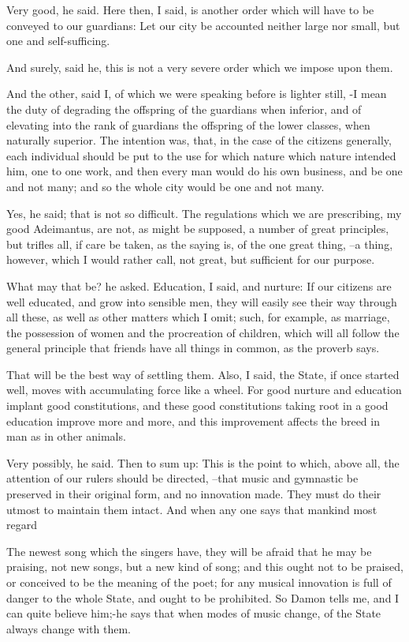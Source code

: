 Very good, he said.
Here then, I said, is another order which will have to be conveyed to our guardians: Let our city be accounted neither large nor small, but one and self-sufficing.

And surely, said he, this is not a very severe order which we impose upon them.

And the other, said I, of which we were speaking before is lighter still, -I mean the duty of degrading the offspring of the guardians when inferior, and of elevating into the rank of guardians the offspring of the lower classes, when naturally superior. The intention was, that, in the case of the citizens generally, each individual should be put to the use for which nature which nature intended him, one to one work, and then every man would do his own business, and be one and not many; and so the whole city would be one and not many.

Yes, he said; that is not so difficult.
The regulations which we are prescribing, my good Adeimantus, are not, as might be supposed, a number of great principles, but trifles all, if care be taken, as the saying is, of the one great thing, --a thing, however, which I would rather call, not great, but sufficient for our purpose.

What may that be? he asked.
Education, I said, and nurture: If our citizens are well educated, and grow into sensible men, they will easily see their way through all these, as well as other matters which I omit; such, for example, as marriage, the possession of women and the procreation of children, which will all follow the general principle that friends have all things in common, as the proverb says.

That will be the best way of settling them.
Also, I said, the State, if once started well, moves with accumulating force like a wheel. For good nurture and education implant good constitutions, and these good constitutions taking root in a good education improve more and more, and this improvement affects the breed in man as in other animals.

Very possibly, he said.
Then to sum up: This is the point to which, above all, the attention of our rulers should be directed, --that music and gymnastic be preserved in their original form, and no innovation made. They must do their utmost to maintain them intact. And when any one says that mankind most regard

The newest song which the singers have, they will be afraid that he may be praising, not new songs, but a new kind of song; and this ought not to be praised, or conceived to be the meaning of the poet; for any musical innovation is full of danger to the whole State, and ought to be prohibited. So Damon tells me, and I can quite believe him;-he says that when modes of music change, of the State always change with them.

